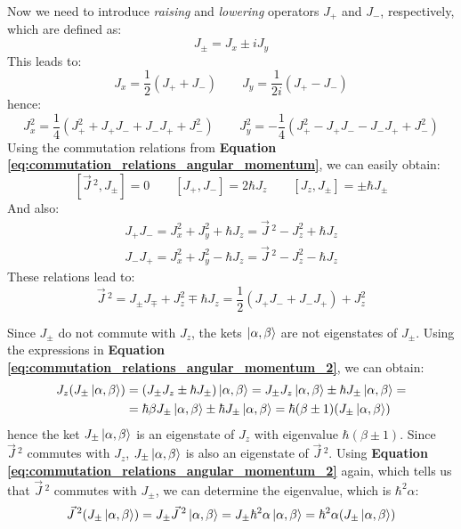 Now we need to introduce \textit{raising} and \textit{lowering} operators $J_+$ and $J_-$, respectively, which are defined as:
\begin{equation}
    J_\pm = J_x \pm iJ_y
\end{equation}
This leads to:
\begin{equation}
    J_x = \frac12(J_+ + J_-)\qquad J_y = \frac{1}{2i}(J_+ - J_-)
\end{equation}
hence:
\begin{equation}
    J_x^2 = \frac14(J_+^2+J_+J_-+J_-J_++J_-^2)\qquad J_y^2 = -\frac{1}{4}(J_+^2-J_+J_--J_-J_++J_-^2)
\end{equation}
Using the commutation relations from \textbf{Equation \ref{eq:commutation_relations_angular_momentum}}, we can easily obtain:
\begin{equation} \label{eq:commutation_relations_angular_momentum_2}
    [\vec{J}\,^2, J_\pm] = 0\qquad [J_+, J_-] = 2\hbar J_z \qquad [J_z, J_\pm] = \pm\hbar J_\pm
\end{equation}
And also:
\begin{equation} \label{j_p_and_j_m_products}
    \begin{split}
        J_+J_- = J_x^2 + J_y^2 + \hbar J_z = \vec{J}\,^2 - J_z^2 + \hbar J_z\\
        J_-J_+ = J_x^2 + J_y^2 - \hbar J_z = \vec{J}\,^2 - J_z^2 - \hbar J_z
    \end{split} 
\end{equation}
These relations lead to:
\begin{equation}
    \vec{J}\,^2 = J_\pm J_\mp + J_z^2 \mp \hbar J_z = \frac12(J_+ J_- + J_- J_+) + J_z^2
\end{equation}

Since $J_\pm$ do not commute with $J_z$, the kets $\ket{\alpha, \beta}$ are not eigenstates of $J_\pm$. Using the expressions in \textbf{Equation \ref{eq:commutation_relations_angular_momentum_2}}, we can obtain:
\begin{equation} \label{eq:jz_jpm_eigenstates}
    \begin{split}
        J_z(J_\pm\ket{\alpha, \beta}) &= (J_\pm J_z \pm \hbar J_\pm)\ket{\alpha, \beta} = J_\pm J_z \ket{\alpha, \beta} \pm \hbar J_\pm \ket{\alpha, \beta} = \\
        &= \hbar \beta J_\pm \ket{\alpha, \beta} \pm \hbar J_\pm \ket{\alpha, \beta} = \hbar(\beta \pm 1)(J_\pm\ket{\alpha, \beta})
    \end{split}
\end{equation} 
hence the ket $J_\pm\ket{\alpha, \beta}$ is an eigenstate of $J_z$ with eigenvalue $\hbar(\beta \pm 1)$. Since $\vec{J}\,^2$ commutes with $J_z$, $J_\pm\ket{\alpha, \beta}$ is also an eigenstate of $\vec{J}\,^2$. Using \textbf{Equation \ref{eq:commutation_relations_angular_momentum_2}} again, which tells us that $\vec{J}\,^2$ commutes with $J_\pm$, we can determine the eigenvalue, which is $\hbar^2\alpha$:
\begin{equation} \label{eq:j2_jpm_eigenstates}
    \vec{J}\,^2(J_\pm\ket{\alpha, \beta}) = J_\pm \vec{J}\,^2\ket{\alpha, \beta} = J_\pm \hbar^2\alpha \ket{\alpha, \beta} = \hbar^2\alpha(J_\pm \ket{\alpha, \beta})
\end{equation}


